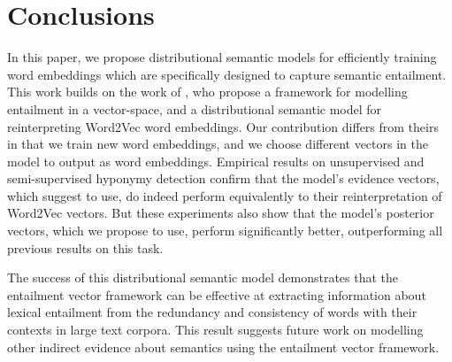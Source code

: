 \documentclass[11pt,a4paper]{article}
\begin{document}
\section{Conclusions}

In this paper, we propose distributional semantic models for efficiently
training word embeddings which are specifically designed to capture semantic
entailment.  This work builds on the work of \citet{Henderson16_acl}, who
propose a  framework for modelling entailment in a vector-space, and a distributional
semantic model for reinterpreting Word2Vec word embeddings.  Our contribution
differs from theirs in that we train new word embeddings, and we choose
different vectors in the model to output as word embeddings.  Empirical
results on unsupervised and semi-supervised hyponymy detection confirm that
the model's evidence vectors, which \citet{Henderson16_acl} suggest to use, do
indeed perform equivalently to their reinterpretation of Word2Vec vectors.  But
these experiments also show that the model's posterior vectors, which we
propose to use, perform significantly better, outperforming all previous
results on this task.

The success of this distributional semantic model demonstrates that the
entailment vector framework can be effective at extracting information about
lexical entailment from the redundancy and consistency of words with their
contexts in large text corpora.  This result suggests future work on modelling
other indirect evidence about semantics using the entailment vector framework.






\end{document}
